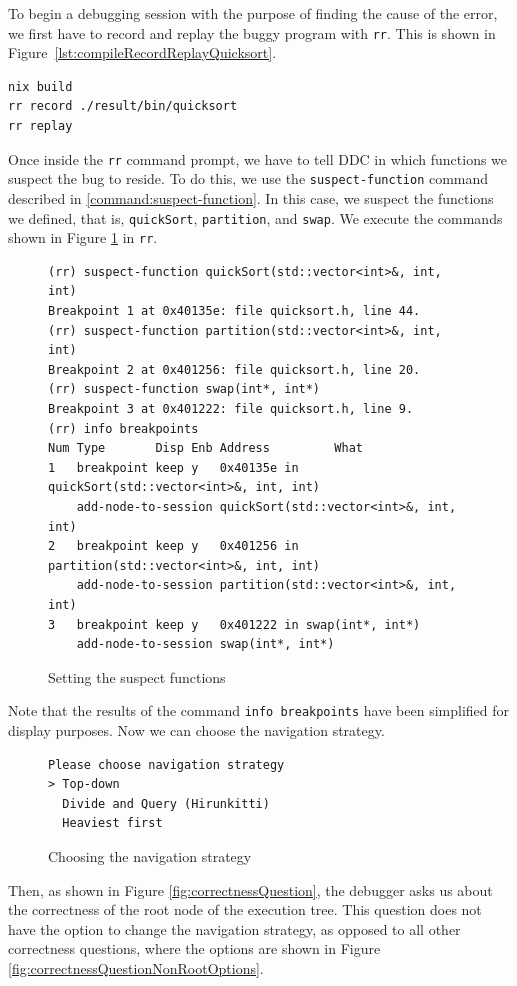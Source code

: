 To begin a debugging session with the purpose of finding the cause of the error, we first have to record and replay the buggy program with \verb|rr|. This is shown in
Figure~\ref{lst:compileRecordReplayQuicksort}.
\begin{lstlisting}[language=bash, caption={Compiling, recording and replaying quickSort}, frame=tb, label={lst:compileRecordReplayQuicksort}]
nix build
rr record ./result/bin/quicksort
rr replay
\end{lstlisting}
Once inside the \verb|rr| command prompt, we have to tell DDC in which functions we suspect the bug to reside.
To do this, we use the \verb|suspect-function| command described in \ref{command:suspect-function}. In this case, we suspect the functions we defined, that is, \verb|quickSort|, \verb|partition|, and \verb|swap|. We execute the commands shown in Figure \ref{fig:suspecting-functions} in \verb|rr|.
\begin{figure}[h]
    \centering
    \caption{Setting the suspect functions}
    \label{fig:suspecting-functions}
    \begin{verbatim}
(rr) suspect-function quickSort(std::vector<int>&, int, int)
Breakpoint 1 at 0x40135e: file quicksort.h, line 44.
(rr) suspect-function partition(std::vector<int>&, int, int)
Breakpoint 2 at 0x401256: file quicksort.h, line 20.
(rr) suspect-function swap(int*, int*)
Breakpoint 3 at 0x401222: file quicksort.h, line 9.
(rr) info breakpoints
Num Type       Disp Enb Address         What
1   breakpoint keep y   0x40135e in quickSort(std::vector<int>&, int, int)
    add-node-to-session quickSort(std::vector<int>&, int, int)
2   breakpoint keep y   0x401256 in partition(std::vector<int>&, int, int)
    add-node-to-session partition(std::vector<int>&, int, int)
3   breakpoint keep y   0x401222 in swap(int*, int*)
    add-node-to-session swap(int*, int*)
    \end{verbatim}
\end{figure}
Note that the results of the command \verb|info breakpoints| have been simplified for display purposes.
Now we can choose the navigation strategy.
\begin{figure}[h]
    \centering
    \caption{Choosing the navigation strategy}
    \label{fig:navigationsStrategyPrompt}
    \begin{verbatim}
Please choose navigation strategy
> Top-down
  Divide and Query (Hirunkitti)
  Heaviest first
    \end{verbatim}
\end{figure}
Then, as shown in Figure \ref{fig:correctnessQuestion}, the debugger asks us about the correctness of the root node of the execution tree. This question does not have the option to change the navigation strategy, as opposed to all other correctness questions, where the options are shown in Figure \ref{fig:correctnessQuestionNonRootOptions}.

